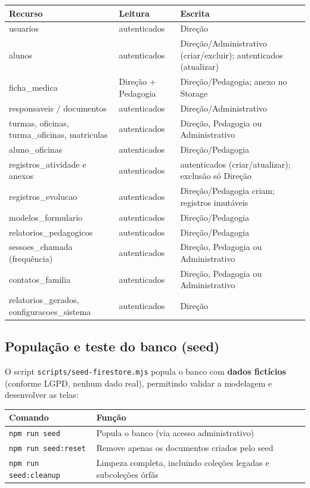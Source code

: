 \documentclass[a4paper,11pt]{article}
\begin{document}
\begin{center}
\small
\begin{tabularx}{\textwidth}{X l l}
\toprule
\textbf{Recurso} & \textbf{Leitura} & \textbf{Escrita} \\
\midrule
usuarios & autenticados & Direção \\
alunos & autenticados & Direção/Administrativo (criar/excluir); autenticados (atualizar) \\
ficha\_medica & Direção + Pedagogia & Direção/Pedagogia; anexo no Storage \\
responsaveis / documentos & autenticados & Direção/Administrativo \\
turmas, oficinas, turma\_oficinas, matriculas & autenticados & Direção, Pedagogia ou Administrativo \\
aluno\_oficinas & autenticados & Direção/Pedagogia \\
registros\_atividade e anexos & autenticados & autenticados (criar/atualizar); exclusão só Direção \\
registros\_evolucao & autenticados & Direção/Pedagogia criam; registros imutáveis \\
modelos\_formulario & autenticados & Direção/Pedagogia \\
relatorios\_pedagogicos & autenticados & Direção/Pedagogia \\
sessoes\_chamada (frequência) & autenticados & Direção, Pedagogia ou Administrativo \\
contatos\_familia & autenticados & Direção, Pedagogia ou Administrativo \\
relatorios\_gerados, configuracoes\_sistema & autenticados & Direção \\
\bottomrule
\end{tabularx}
\end{center}

\subsection{População e teste do banco (seed)}

O script \texttt{scripts/seed-firestore.mjs} popula o banco com \textbf{dados fictícios} (conforme LGPD, nenhum dado real), permitindo validar a modelagem e desenvolver as telas:

\begin{center}
\begin{tabularx}{\textwidth}{l X}
\toprule
\textbf{Comando} & \textbf{Função} \\
\midrule
\texttt{npm run seed} & Popula o banco (via acesso administrativo) \\
\texttt{npm run seed:reset} & Remove apenas os documentos criados pelo seed \\
\texttt{npm run seed:cleanup} & Limpeza completa, incluindo coleções legadas e subcoleções órfãs \\
\bottomrule
\end{tabularx}
\end{center}
\end{document}
